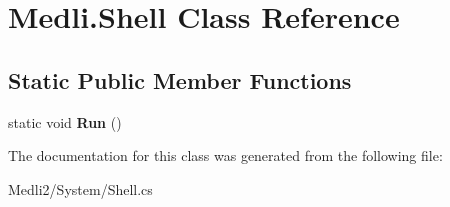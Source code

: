\hypertarget{class_medli_1_1_shell}{}\section{Medli.\+Shell Class Reference}
\label{class_medli_1_1_shell}
\subsection*{Static Public Member Functions}
\begin{DoxyCompactItemize}
\item 
\mbox{\label{class_medli_1_1_shell_a9e200586d8cb983a6dd96b2cb1bfec87}} 
static void {\bfseries Run} ()
\end{DoxyCompactItemize}


The documentation for this class was generated from the following file\+:\begin{DoxyCompactItemize}
\item 
Medli2/\+System/Shell.\+cs\end{DoxyCompactItemize}

